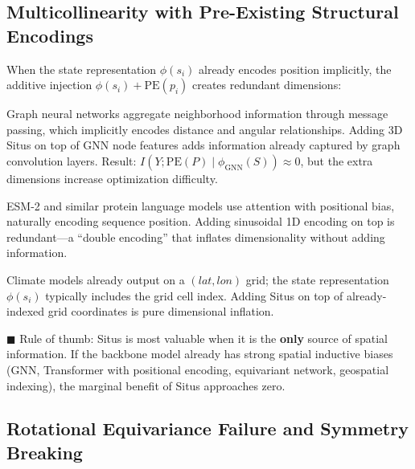 \documentclass[12pt,a4paper]{article}
\begin{document}
\subsection{Multicollinearity with Pre-Existing Structural Encodings}
\label{sec:multi}

When the state representation $\phi(s_i)$ already encodes position implicitly, the additive injection $\phi(s_i) + \mathrm{PE}(p_i)$ creates redundant dimensions:

\begin{description}[leftmargin=1.5cm]
\item[\textbf{GNN + Situs on crystals}.] Graph neural networks aggregate neighborhood information through message passing, which implicitly encodes distance and angular relationships. Adding 3D Situs on top of GNN node features adds information already captured by graph convolution layers. Result: $I(Y; \mathrm{PE}(P) \mid \phi_{\text{GNN}}(S)) \approx 0$, but the extra dimensions increase optimization difficulty.

\item[\textbf{pLM + Situs on proteins}.] ESM-2 and similar protein language models use attention with positional bias, naturally encoding sequence position. Adding sinusoidal 1D encoding on top is redundant—a ``double encoding'' that inflates dimensionality without adding information.

\item[\textbf{Climate model output statistics + Situs}.] Climate models already output on a $(lat,lon)$ grid; the state representation $\phi(s_i)$ typically includes the grid cell index. Adding Situs on top of already-indexed grid coordinates is pure dimensional inflation.
\end{description}

\textcolor{warning}{$\blacksquare$ Rule of thumb}: Situs is most valuable when it is the \textbf{only} source of spatial information. If the backbone model already has strong spatial inductive biases (GNN, Transformer with positional encoding\cite{vaswani2017}, equivariant network, geospatial indexing), the marginal benefit of Situs approaches zero.

\subsection{Rotational Equivariance Failure and Symmetry Breaking}
\label{sec:rotation}
\end{document}

